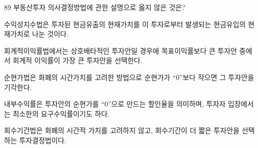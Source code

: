 \begin{question}{89}
부동산투자 의사결정방법에 관한 설명으로 옳지 않은 것은?
\begin{choices}
  \item 수익성지수법은 투자된 현금유출의 현재가치를 이 투자로부터 발생되는 현금유입의 현재가치로 나눈 것이다.
  \item 회계적이익률법에서는 상호배타적인 투자안일 경우에 목표이익률보다 큰 투자안 중에서 회계적 이익률이 가장 큰 투자안을 선택한다.
  \item 순현가법은 화폐의 시간가치를 고려한 방법으로 순현가가 “0”보다 작으면 그 투자안을 기각한다.
  \item 내부수익률은 투자안의 순현가를 “0”으로 만드는 할인율을 의미하며, 투자자 입장에서는 최소한의 요구수익률이기도 하다.
  \item 회수기간법은 화폐의 시간적 가치를 고려하지 않고, 회수기간이 더 짧은 투자안을 선택하는 투자결정법이다.
\end{choices}
\end{question}
